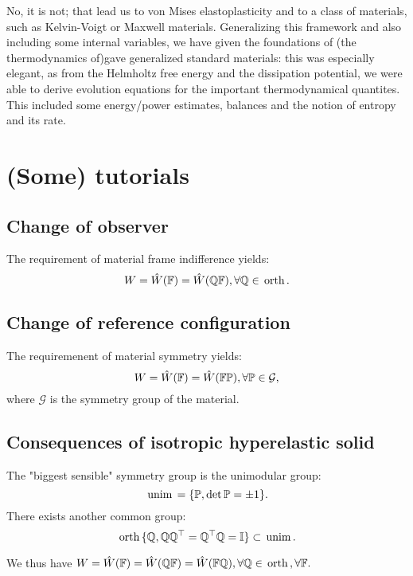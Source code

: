 \documentclass[11pt]{scrartcl} %
\begin{document}
No, it is not; that lead us to von Mises elastoplasticity and to a class of materials, such as Kelvin-Voigt or Maxwell materials. Generalizing this framework and also including some internal variables, we have given the foundations of (the thermodynamics of)gave generalized standard materials: this was especially elegant, as from the Helmholtz free energy and the dissipation potential, we were able to derive evolution equations for the important thermodynamical quantites. This included some energy/power estimates, balances and the notion of entropy and its rate. 

\section{(Some) tutorials}
\label{sec:tutorials}

\subsection{Change of observer}
\label{sec:chobserver}

The requirement of material frame indifference yields:
\[
	W = \hat{W}\qty(\mathbb{F}) = \hat{W}\qty(\mathbb{Q}\mathbb{F}), \forall \mathbb{Q} \in \, \text{orth} \,.
\]

\subsection{Change of reference configuration}
\label{sec:chreference}
The requiremenent of material symmetry yields:
\[
	W= \hat{W}\qty(\mathbb{F})= \hat{W}\qty(\mathbb{F} \mathbb{P}), \forall \mathbb{P} \in \mathcal{G},
\]
where $\mathcal{G}$ is the symmetry group of the material.

\subsection{Consequences of isotropic hyperelastic solid}
\label{sec:conshypelisosolid}

\begin{remark}
	The "biggest sensible" symmetry group is the unimodular group:
	\[
		\, \text{unim} \, = \{\mathbb{P}, \det \mathbb{P} = \pm 1\}.
	\]
	There exists another common group:
	\[
		\, \text{orth} \, \{ \mathbb{Q}, \mathbb{Q}\mathbb{Q}^\top = \mathbb{Q}^\top \mathbb{Q} = \mathbb{I}\} \subset \, \text{unim} \,.
	\]
\end{remark}
We thus have $W = \hat{W}\qty(\mathbb{F}) = \hat{W}\qty(\mathbb{Q}\mathbb{F}) = \hat{W}\qty(\mathbb{F} \mathbb{Q}), \forall \mathbb{Q} \in \, \text{orth} \,, \forall \mathbb{F}.$
\end{document}
